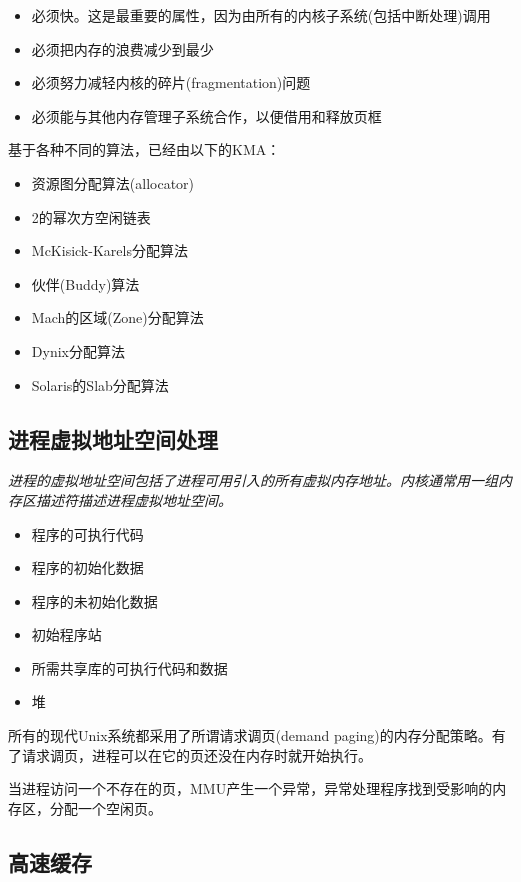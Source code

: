 \begin{itemize}
    \item 必须快。这是最重要的属性，因为由所有的内核子系统(包括中断处理)调用
    \item 必须把内存的浪费减少到最少
    \item 必须努力减轻内核的碎片(fragmentation)问题
    \item 必须能与其他内存管理子系统合作，以便借用和释放页框
\end{itemize}

    基于各种不同的算法，已经由以下的KMA：

\begin{itemize}
    \item 资源图分配算法(allocator)
    \item 2的幂次方空闲链表
    \item McKisick-Karels分配算法
    \item 伙伴(Buddy)算法
    \item Mach的区域(Zone)分配算法
    \item Dynix分配算法
    \item Solaris的Slab分配算法
\end{itemize}

\subsection{进程虚拟地址空间处理}

    \emph{进程的虚拟地址空间包括了进程可用引入的所有虚拟内存地址。内核通常用一组内存区描述符描述进程虚拟地址空间。}

\begin{itemize}
    \item 程序的可执行代码
    \item 程序的初始化数据
    \item 程序的未初始化数据
    \item 初始程序站
    \item 所需共享库的可执行代码和数据
    \item 堆
\end{itemize}

    所有的现代Unix系统都采用了所谓请求调页(demand paging)的内存分配策略。有了请求调页，进程可以在它的页还没在内存时就开始执行。

    当进程访问一个不存在的页，MMU产生一个异常，异常处理程序找到受影响的内存区，分配一个空闲页。

\subsection{高速缓存}

